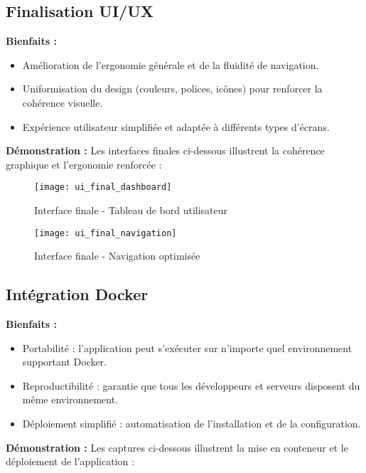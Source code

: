 \subsection{Finalisation UI/UX}

\textbf{Bienfaits :}
\begin{itemize}
    \item Amélioration de l’ergonomie générale et de la fluidité de navigation.
    \item Uniformisation du design (couleurs, polices, icônes) pour renforcer la cohérence visuelle.
    \item Expérience utilisateur simplifiée et adaptée à différents types d’écrans.
\end{itemize}

\textbf{Démonstration :}  
Les interfaces finales ci-dessous illustrent la cohérence graphique et l’ergonomie renforcée :

\begin{figure}[H]
    \centering
    \texttt{[image: ui\_final\_dashboard]}
    \caption{Interface finale - Tableau de bord utilisateur}
    
    \centering
    \texttt{[image: ui\_final\_navigation]}
    \caption{Interface finale - Navigation optimisée}
\end{figure}

\subsection{Intégration Docker}

\textbf{Bienfaits :}
\begin{itemize}
    \item Portabilité : l’application peut s’exécuter sur n’importe quel environnement supportant Docker.
    \item Reproductibilité : garantie que tous les développeurs et serveurs disposent du même environnement.
    \item Déploiement simplifié : automatisation de l’installation et de la configuration.
\end{itemize}

\textbf{Démonstration :}  
Les captures ci-dessous illustrent la mise en conteneur et le déploiement de l’application :

